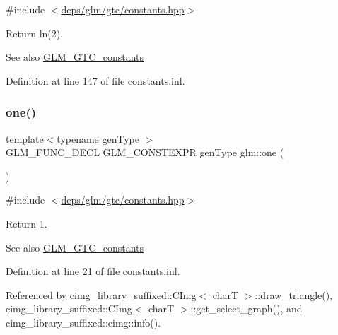 {\ttfamily \#include $<$\hyperlink{constants_8hpp}{deps/glm/gtc/constants.\+hpp}$>$}

Return ln(2). \begin{DoxySeeAlso}{See also}
\hyperlink{group__gtc__constants}{G\+L\+M\+\_\+\+G\+T\+C\+\_\+constants} 
\end{DoxySeeAlso}


Definition at line 147 of file constants.\+inl.

\mbox{\label{group__gtc__constants_ga39c2fb227631ca25894326529bdd1ee5}} 
\subsubsection{\texorpdfstring{one()}{one()}}
{\footnotesize\ttfamily template$<$typename gen\+Type $>$ \\
G\+L\+M\+\_\+\+F\+U\+N\+C\+\_\+\+D\+E\+CL G\+L\+M\+\_\+\+C\+O\+N\+S\+T\+E\+X\+PR gen\+Type glm\+::one (\begin{DoxyParamCaption}{ }\end{DoxyParamCaption})}



{\ttfamily \#include $<$\hyperlink{constants_8hpp}{deps/glm/gtc/constants.\+hpp}$>$}

Return 1. \begin{DoxySeeAlso}{See also}
\hyperlink{group__gtc__constants}{G\+L\+M\+\_\+\+G\+T\+C\+\_\+constants} 
\end{DoxySeeAlso}


Definition at line 21 of file constants.\+inl.



Referenced by cimg\+\_\+library\+\_\+suffixed\+::\+C\+Img$<$ char\+T $>$\+::draw\+\_\+triangle(), cimg\+\_\+library\+\_\+suffixed\+::\+C\+Img$<$ char\+T $>$\+::get\+\_\+select\+\_\+graph(), and cimg\+\_\+library\+\_\+suffixed\+::cimg\+::info().

